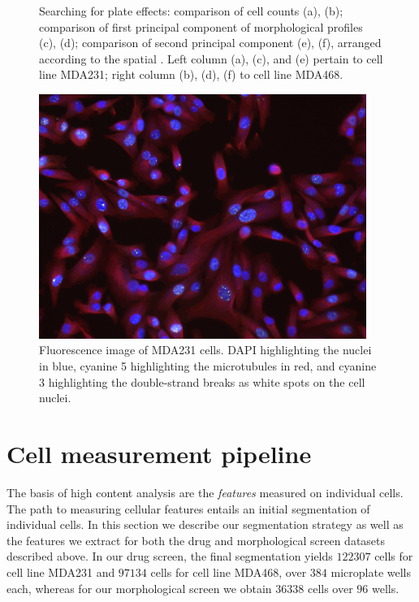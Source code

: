 \begin{figure}
    \caption{Searching for plate effects: comparison of cell counts (a), (b); comparison of first principal component of morphological profiles (c), (d); comparison of second principal component (e), (f), arranged according to the spatial . Left column (a), (c), and (e) pertain to cell line MDA231; right column (b), (d), (f) to cell line MDA468.}%
    \label{fig:plateeffects}%
\end{figure}

\begin{figure}[h]
\begin{center}
\includegraphics[width=0.95\textwidth]{img/channels.png}
\caption{Fluorescence image of MDA231 cells. DAPI highlighting the nuclei in blue, cyanine 5 highlighting the microtubules in red, and cyanine 3 highlighting the double-strand breaks as white spots on the cell nuclei.}
\label{fig:drug_full_fluorescence}
\end{center}
\end{figure}

\section{Cell measurement pipeline}
\label{sec:cell_measurement}

The basis of high content analysis are the \emph{features} measured on individual cells. The path to measuring cellular features entails an initial segmentation of individual cells. In this section we describe our segmentation strategy as well as the features we extract for both the drug and morphological screen datasets described above. In our drug screen, the final segmentation yields $122307$ cells for cell line MDA231 and $97134$ cells for cell line MDA468, over $384$ microplate wells each, whereas for our morphological screen we obtain $36338$ cells over $96$ wells.

